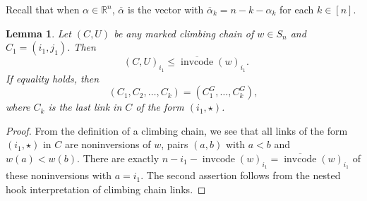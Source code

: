 \documentclass[11pt]{amsart}
\newtheorem{lemma}[theorem]{Lemma}
\theoremstyle{definition}
\theoremstyle{named}
\newcommand{\CG}{C^G}
\DeclareMathOperator{\cc}{\mathrm{invcode}} %
\newcommand{\occ}{\overline{\cc}} %
\DeclareMathOperator{\dwt}{\overline{\mathrm{wt}}}
\begin{document}
	Recall that when $\alpha\in\mathbb{R}^n$, $\overline{\alpha}$ is the vector with $\overline{\alpha}_k=n-k-\alpha_k$ for each $k\in[n]$.
	
	\begin{lemma}
		\label{lem:maxmarkedones}
		Let $(C,U)$ be any marked climbing chain of $w\in S_n$ and $C_1=(i_1,j_1)$. Then 
		\[\dwt(C,U)_{i_1} \leq \occ(w)_{i_1}.\]
		If equality holds, then 
		\[(C_1,C_2,\ldots,C_k) = (\CG_1,\ldots,\CG_k), \]
		where $C_k$ is the last link in $C$ of the form $(i_1,\star)$.
	\end{lemma}
	\begin{proof}
		From the definition of a climbing chain, we see that all links of the form $(i_1,\star)$ in $C$ are noninversions of $w$, pairs $(a,b)$ with $a<b$ and $w(a)<w(b)$. There are exactly $n-i_1-\cc(w)_{i_1} = \occ(w)_{i_1}$ of these noninversions with $a=i_1$. The second assertion follows from the nested hook interpretation of climbing chain links.
	\end{proof}
\end{document}
